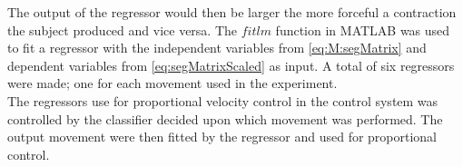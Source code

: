 The output of the regressor would then be larger the more forceful a contraction the subject produced and vice versa. The $fitlm$ function in MATLAB was used to fit a regressor with the independent variables from \eqref{eq:M:segMatrix} and dependent variables from \eqref{eq:segMatrixScaled} as input. A total of six regressors were made; one for each movement used in the experiment. \\
The regressors use for proportional velocity control in the control system was controlled by the classifier decided upon which movement was performed. The output movement were then fitted by the regressor and used for proportional control. 



